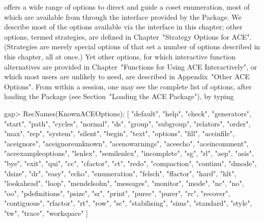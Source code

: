 

{\ACE} offers a wide range of options to  direct  and  guide  a  coset
enumeration, most of which  are  available  from  {\GAP}  through  the
interface provided by the {\ACE} Package.  We  describe  most  of  the
options available via the interface in this  chapter;  other  options,
termed strategies, are defined in Chapter~"Strategy Options for  ACE".
(Strategies are merely special options of {\ACE} that set a number  of
options described in this chapter, all at once.)  Yet  other  options,
for  which  interactive  function   alternatives   are   provided   in
Chapter~"Functions for Using ACE Interactively", or which most  {\GAP}
users are unlikely to  need,  are  described  in  Appendix~"Other  ACE
Options". From within a {\GAP} session, one may see the complete  list
of  {\ACE}  options,   after   loading   the   {\ACE}   Package   (see
Section~"Loading the ACE Package"), by typing

\beginexample
gap> RecNames(KnownACEOptions);
[ "default", "help", "check", "generators", "start", "path", "cycles", 
  "normal", "ds", "group", "subgroup", "relators", "order", "max", "rep", 
  "system", "silent", "begin", "text", "options", "fill",
  "aceinfile", "aceignore", "aceignoreunknown", "acenowarnings", "aceecho", 
  "aceincomment", "aceexampleoptions", "lenlex", "semilenlex", "incomplete", 
  "sg", "rl", "aep", "asis", "bye", "exit", "qui", 
  "cc", "cfactor", "ct", "redo", "compaction", "continu", "dmode", "dsize", 
  "dr", "easy", "echo", "enumeration", "felsch", "ffactor", "hard", 
  "hlt", "lookahead", "loop", "mendelsohn", "messages", "monitor",
  "mode", "nc", "no", "oo", "pdefinitions", "psize", "sr", "print", "purec",
  "purer", "rc", "recover", "contiguous", "rfactor", "rt", "row", "sc", 
  "stabilising", "sims", "standard", "style", "tw",
  "trace", "workspace" ]

\endexample

